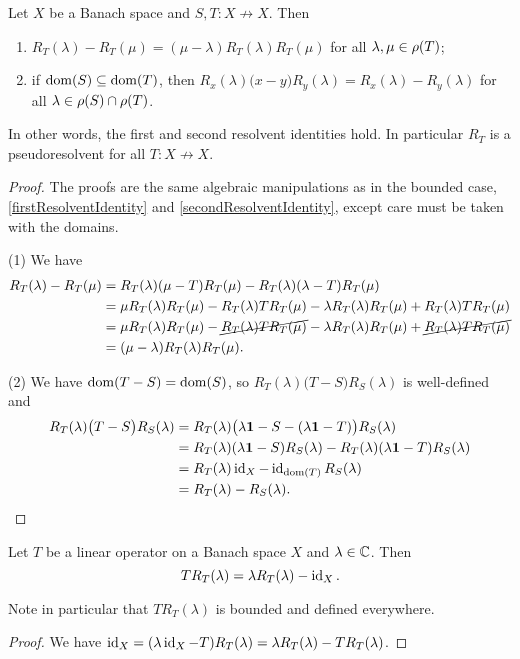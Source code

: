\begin{proposition}
Let $X$ be a Banach space and $S,T: X\not\to X$. Then
\begin{enumerate}
\item $R_T(\lambda) - R_T(\mu) = (\mu - \lambda)R_T(\lambda)R_T(\mu)$ for all $\lambda, \mu\in \rho(T)$;
\item if $\operatorname{dom}(S)\subseteq \operatorname{dom}(T)$, then $R_x(\lambda)\big(x-y\big)R_y(\lambda) = R_x(\lambda) - R_y(\lambda)$ for all $\lambda\in \rho(S)\cap \rho(T)$.
\end{enumerate}
\end{proposition}
In other words, the first and second resolvent identities hold.
In particular $R_T$ is a pseudoresolvent for all $T:X\not\to X$.
\begin{proof}
The proofs are the same algebraic manipulations as in the bounded case, \ref{firstResolventIdentity} and \ref{secondResolventIdentity}, except care must be taken with the domains.

(1) We have
\begin{align*}
R_T(\lambda) - R_T(\mu) &= R_T(\lambda)(\mu - T)R_T(\mu) - R_T(\lambda)(\lambda - T)R_T(\mu) \\
&= \mu R_T(\lambda)R_T(\mu) - R_T(\lambda)TR_T(\mu) - \lambda R_T(\lambda)R_T(\mu) + R_T(\lambda)TR_T(\mu) \\
&= \mu R_T(\lambda)R_T(\mu) - \cancel{R_T(\lambda)TR_T(\mu)} - \lambda R_T(\lambda)R_T(\mu) + \cancel{R_T(\lambda)TR_T(\mu)} \\
&= (\mu - \lambda)R_T(\lambda)R_T(\mu).
\end{align*}

(2) We have $\operatorname{dom}(T-S) = \operatorname{dom}(S)$, so $R_T(\lambda)\big(T-S\big)R_S(\lambda)$ is well-defined and
\begin{align*}
R_T(\lambda)\big(T-S\big)R_S(\lambda) &= R_T(\lambda)\big(\lambda\boldsymbol{\mathrm{1}}-S - (\lambda\boldsymbol{\mathrm{1}} - T)\big)R_S(\lambda) \\
&= R_T(\lambda)(\lambda\boldsymbol{\mathrm{1}}-S)R_S(\lambda) - R_T(\lambda)(\lambda\boldsymbol{\mathrm{1}} - T)R_S(\lambda) \\
&= R_T(\lambda)\operatorname{id}_{X} - \operatorname{id}_{\operatorname{dom}(T)}R_S(\lambda) \\
&= R_T(\lambda) - R_S(\lambda).
\end{align*}
\end{proof}

\begin{lemma} \label{operatorResolventMultiplication}
Let $T$ be a linear operator on a Banach space $X$ and $\lambda\in\mathbb{C}$. Then
\[ TR_T(\lambda) = \lambda R_T(\lambda) - \operatorname{id}_X. \]
\end{lemma}
Note in particular that $TR_T(\lambda)$ is bounded and defined everywhere.
\begin{proof}
We have $\operatorname{id}_X = (\lambda \operatorname{id}_X - T)R_T(\lambda) = \lambda R_T(\lambda) - TR_T(\lambda)$.
\end{proof}

